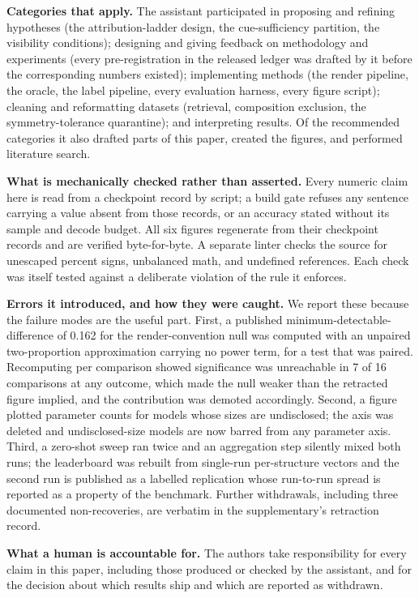 \textbf{Categories that apply.} The assistant participated in proposing and refining hypotheses (the
attribution-ladder design, the cue-sufficiency partition, the visibility conditions); designing and giving
feedback on methodology and experiments (every pre-registration in the released ledger was drafted by it
before the corresponding numbers existed); implementing methods (the render pipeline, the oracle, the label
pipeline, every evaluation harness, every figure script); cleaning and reformatting datasets (retrieval,
composition exclusion, the symmetry-tolerance quarantine); and interpreting results. Of the recommended
categories it also drafted parts of this paper, created the figures, and performed literature search.

\textbf{What is mechanically checked rather than asserted.} Every numeric claim here is read from a
checkpoint record by script; a build gate refuses any sentence carrying a value absent from those records,
or an accuracy stated without its sample and decode budget. All six figures regenerate from their
checkpoint records and are verified byte-for-byte. A separate linter checks the source for unescaped
percent signs, unbalanced math, and undefined references. Each check was itself tested against a deliberate
violation of the rule it enforces.

\textbf{Errors it introduced, and how they were caught.} We report these because the failure modes are the
useful part. First, a published minimum-detectable-difference of 0.162 for the render-convention null was
computed with an unpaired two-proportion approximation carrying no power term, for a test that was paired.
Recomputing per comparison showed significance was unreachable in 7 of 16 comparisons at any outcome, which
made the null weaker than the retracted figure implied, and the contribution was demoted accordingly.
Second, a figure plotted parameter counts for models whose sizes are undisclosed; the axis was deleted and
undisclosed-size models are now barred from any parameter axis. Third, a zero-shot sweep ran twice and an
aggregation step silently mixed both runs; the leaderboard was rebuilt from single-run per-structure
vectors and the second run is published as a labelled replication whose run-to-run spread is reported as a
property of the benchmark. Further withdrawals, including three documented non-recoveries, are verbatim in
the supplementary's retraction record.

\textbf{What a human is accountable for.} The authors take responsibility for every claim in this paper,
including those produced or checked by the assistant, and for the decision about which results ship and
which are reported as withdrawn.
